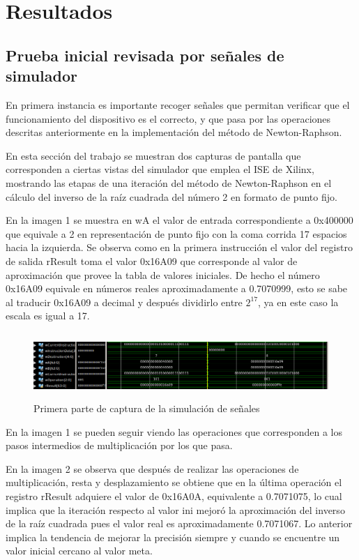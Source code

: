 \chapter{Resultados}

\section{Prueba inicial revisada por señales de simulador}

En primera instancia es importante recoger señales que permitan verificar que el funcionamiento del dispositivo es el correcto, y que pasa por las operaciones descritas anteriormente en la implementación del método de Newton-Raphson.

En esta sección del trabajo se muestran dos capturas de pantalla que corresponden a ciertas vistas del simulador que emplea el ISE de Xilinx, mostrando las etapas de una iteración del método de Newton-Raphson en el cálculo del inverso de la raíz cuadrada del número 2 en formato de punto fijo.

En la imagen 1 se muestra en wA el valor de entrada correspondiente a 0x400000 que equivale a 2 en representación de punto fijo con la coma corrida 17 espacios hacia la izquierda. Se observa como en la primera instrucción el valor del registro de salida rResult toma el valor 0x16A09 que corresponde al valor de aproximación que provee la tabla de valores iniciales. De hecho el número 0x16A09 equivale en números reales aproximadamente a 0.7070999, esto se sabe al traducir 0x16A09 a decimal y después dividirlo entre $2^{17}$, ya en este caso la escala es igual a 17.  

\begin{figure}
	\includegraphics[width=1\linewidth, height=2.5cm]{images/Selection_010}
	\caption{Primera parte de captura de la simulación de señales} \label{fig:sim1}
\end{figure}

En la imagen 1 se pueden seguir viendo las operaciones que corresponden a los pasos intermedios de multiplicación por los que pasa.

En la imagen 2 se observa que después de realizar las operaciones de multiplicación, resta y desplazamiento se obtiene que en la última operación el registro rResult adquiere el valor de 0x16A0A, equivalente a 0.7071075, lo cual implica que la iteración respecto al valor ini mejoró la aproximación del inverso de la raíz cuadrada pues el valor real es aproximadamente 0.7071067. Lo anterior implica la tendencia de mejorar la precisión siempre y cuando se encuentre un valor inicial cercano al valor meta. 

